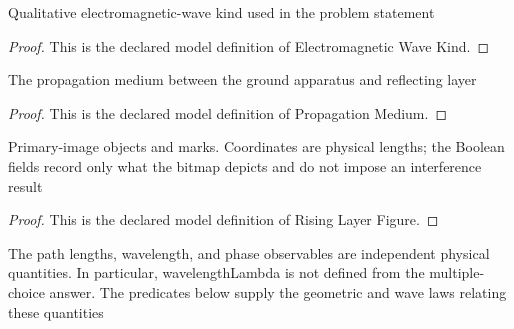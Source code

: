 \begin{definition}
  \label{def:physics:phyx-mini-0329:phyxminiproblems-problemphyxmini0329-electromagneticwavekind}
  Qualitative electromagnetic-wave kind used in the problem statement
\end{definition}
\begin{proof}
  This is the declared model definition of Electromagnetic Wave Kind.
\end{proof}
\begin{definition}
  \label{def:physics:phyx-mini-0329:phyxminiproblems-problemphyxmini0329-propagationmedium}
  The propagation medium between the ground apparatus and reflecting layer
\end{definition}
\begin{proof}
  This is the declared model definition of Propagation Medium.
\end{proof}
\begin{definition}
  \label{def:physics:phyx-mini-0329:phyxminiproblems-problemphyxmini0329-risinglayerfigure}
  Primary-image objects and marks. Coordinates are physical lengths; the Boolean fields record only what the bitmap depicts and do not impose an interference result
\end{definition}
\begin{proof}
  This is the declared model definition of Rising Layer Figure.
\end{proof}
\begin{definition}
  \label{def:physics:phyx-mini-0329:phyxminiproblems-problemphyxmini0329-atmosphericlayerinterferencesetup}
  The path lengths, wavelength, and phase observables are independent physical quantities. In particular, wavelengthLambda is not defined from the multiple-choice answer. The predicates below supply the geometric and wave laws relating these quantities
\end{definition}
